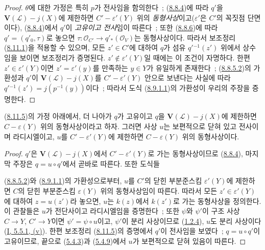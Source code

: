\begin{proof}
$\theta$에 대한 가정은 특히 $p$가 전사임을 함의한다~;
(\hyperref[II.8.8.4-ko]{8.8.4})에 따라 $q'$을
$\mathbf{V}(\mathcal{L})-j(X)$에 제한하면
$C'-\varepsilon'(Y)$ 위의 \emph{동형사상}이고($\varepsilon'$은 $C'$의
꼭짓점 단면이다), (\hyperref[II.8.8.4-ko]{8.8.4})에서 $q'$이
\emph{고유이고 전사}임이 따른다~; 또한
(\hyperref[II.8.8.6-ko]{8.8.6})에 따라 $q'=(q'_0,\tau)$로 놓으면
$\tau:\mathcal{O}_{C'}\to q'_*(\mathcal{O}_V)$는 동형사상이다. 따라서
보조정리 (\hyperref[II.8.11.1-ko]{8.11.1})을 적용할 수 있으며, 모든
$z'\in C'$에 대하여 $q$가 섬유 $q'{}^{-1}(z')$ 위에서 상수임을 보이면
보조정리가 증명된다. $z'\notin\varepsilon'(Y)$일 때에는 이 조건이
자명하다. 한편 $z'\in\varepsilon'(Y)$이면
$z'=\varepsilon'(y)$를 만족하는 $y\in Y$가 유일하게 존재한다~;
(\hyperref[II.8.8.5.2-ko]{8.8.5.2})의 가환성과 $q'$이
$\mathbf{V}(\mathcal{L})-j(X)$를 $C'-\varepsilon'(Y)$ 안으로 보낸다는
사실에 따라 $q'{}^{-1}(z')=j(p^{-1}(y))$이다~; 따라서 도식
(\hyperref[II.8.9.1.1-ko]{8.9.1.1})의 가환성이 우리의 주장을 증명한다.
\end{proof}

\begin{corollary}[8.11.6]
\label{II.8.11.6-ko}
(\hyperref[II.8.11.5-ko]{8.11.5})의 가정 아래에서, 더 나아가 $q$가
고유이고 $q$을 $\mathbf{V}(\mathcal{L})-j(X)$에 제한하면
$C-\varepsilon(Y)$ 위의 동형사상이라고 하자. 그러면 사상 $u$는
보편적으로 닫혀 있고 전사이며 라디시엘이고, $u$를
$C'-\varepsilon'(Y)$에 제한하면 $C-\varepsilon(Y)$ 위의 동형사상이다.
\end{corollary}

\begin{proof}
$q'$은 $\mathbf{V}(\mathcal{L})-j(X)$에서 $C'-\varepsilon'(Y)$로 가는
동형사상이므로 (\hyperref[II.8.8.4-ko]{8.8.4}), 마지막 주장은
$q=u\circ q'$에서 곧바로 따른다. 또한 도식들

(\hyperref[II.8.8.5.2-ko]{8.8.5.2})와
(\hyperref[II.8.9.1.1-ko]{8.9.1.1})의 가환성으로부터, $u$를 $C'$의
닫힌 부분준스킴 $\varepsilon'(Y)$에 제한하면 $C$의 닫힌 부분준스킴
$\varepsilon(Y)$ 위의 동형사상임이 따른다. 따라서 모든
$z'\in\varepsilon'(Y)$에 대하여 $z=u(z')$라 놓으면, $u$는 $k(z)$에서
$k(z')$로 가는 동형사상을 정의한다. 이 관찰들은 $u$가 전단사이고
라디시엘임을 증명한다~; 또한 $\psi$와 $\psi'$이 구조 사상
$C\to Y$, $C'\to Y$이면 $\psi'=\psi\circ u$이고, $\psi'$이 분리 사상이므로
(\hyperref[II.1.2.4-ko]{1.2.4}), $u$도 분리 사상이다
(\hyperref[I.5.5.1-ko]{I, 5.5.1, (v)}). 한편 보조정리
(\hyperref[II.8.11.5-ko]{8.11.5})의 증명에서 $q'$이 전사임을 보였다~;
$q=u\circ q'$이 고유이므로, 끝으로 (\hyperref[II.5.4.3-ko]{5.4.3})과
(\hyperref[II.5.4.9-ko]{5.4.9})에서 $u$가 보편적으로 닫혀 있음이 따른다.
\end{proof}

